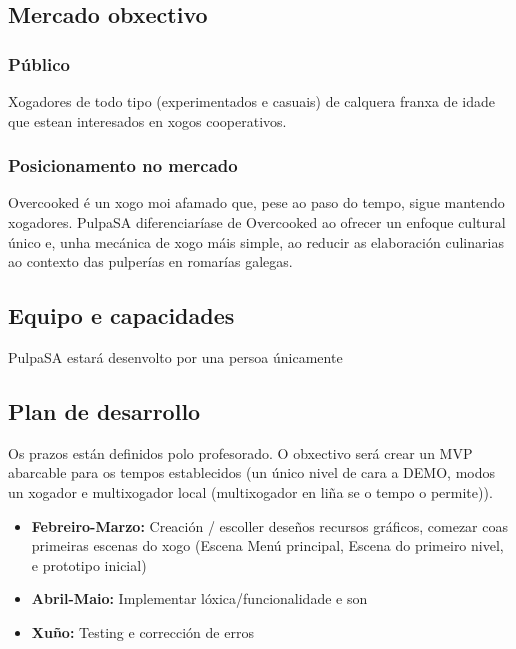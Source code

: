 \documentclass{report}  %
\begin{document}
\subsection{Mercado obxectivo}

\subsubsection{Público}
Xogadores de todo tipo (experimentados e casuais) de calquera franxa de 
idade que estean interesados en xogos cooperativos. 

\subsubsection{Posicionamento no mercado}
Overcooked é un xogo moi afamado que, pese ao paso do tempo, sigue 
mantendo xogadores. PulpaSA diferenciaríase de Overcooked ao ofrecer un 
enfoque cultural único e, unha mecánica de xogo máis simple, ao reducir as 
elaboración culinarias ao contexto das pulperías en romarías galegas. 

\subsection{Equipo e capacidades}

PulpaSA estará desenvolto por una persoa únicamente

\subsection{Plan de desarrollo}

Os prazos están definidos polo profesorado. O obxectivo será crear un MVP 
abarcable para os tempos establecidos (un único nivel de cara a DEMO, modos 
un xogador e multixogador local (multixogador en liña se o tempo o permite)). 
\begin{itemize}
    \item \textbf{Febreiro-Marzo:} Creación / escoller deseños recursos gráficos, comezar coas 
primeiras escenas do xogo (Escena Menú principal, Escena do primeiro nivel, e 
prototipo inicial) 
\item \textbf{Abril-Maio:} Implementar lóxica/funcionalidade e son 
\item \textbf{Xuño:} Testing e corrección de erros 
\end{itemize}
\end{document}
